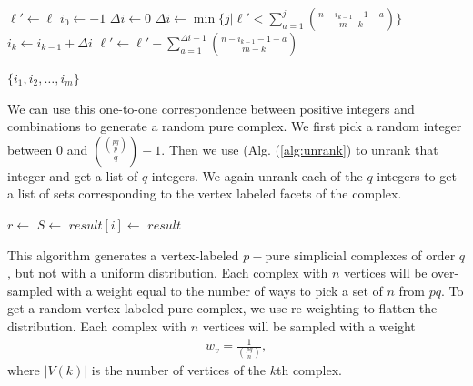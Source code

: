 \documentclass[12pt]{article}
\theoremstyle{plain}
\theoremstyle{definition}
\theoremstyle{remark}
\begin{document}
\begin{algorithm}[H]
\caption{\label{alg:unrank}Find the combination corresponding to a non-negative integer}
    \begin{algorithmic}
        \State $\ell'\gets\ell$
        \State $i_0 \gets -1$
        \State $\Delta i \gets 0$
        \State $\Delta i \gets \min\{j|\ell' < \sum_{a=1}^{j}\binom{n-i_{k-1}-1-a}{m-k}\}$
        \State $i_k\gets i_{k-1}+\Delta i $
        \State $\ell'\gets \ell'-\sum_{a=1}^{\Delta i -1}\binom{n-i_{k-1}-1-a}{m-k}$
        
        \EndFor    
        \State\Return $\{i_1,i_2,\dots,i_m\}$
        \EndFunction
    \end{algorithmic}
\end{algorithm}

We can use this one-to-one correspondence between positive integers and combinations to generate a random pure complex. We first pick a random integer between $0$ and $\binom{\binom{pq}{p}}{q}-1$. Then we use (Alg. (\ref{alg:unrank}) to unrank that integer and get a list of $q$ integers. We again unrank each of the $q$ integers to get a list of sets corresponding to the vertex labeled facets of the complex.  

 \begin{algorithm}[H]
 \caption{\label{alg:random-pure-complex}Generates a random pure complex in $\mathcal{Y}_v(p,q)$}
    \begin{algorithmic}[1]
        \State $r \gets$ 
        \State $S \gets $ 
        \State$result[i] \gets$  
        \EndFor
        \State\Return $result$
        \EndFunction
     \end{algorithmic}
 \end{algorithm}

This algorithm generates a vertex-labeled $p-$pure simplicial complexes of order $q$, but not with a uniform distribution. Each complex with $n$ vertices will be over-sampled with a weight equal to the number of ways to pick a set of $n$ from $pq$. To get a random vertex-labeled pure complex, we use re-weighting to flatten the distribution. Each complex with $n$ vertices will be sampled with a weight  
\begin{align}
\label{eq:sumsvpq}
    w_v = \frac{1}{\binom{pq}{n}},
\end{align}
where $|V(k)|$ is the number of vertices of the $k$th complex.
\end{document}
